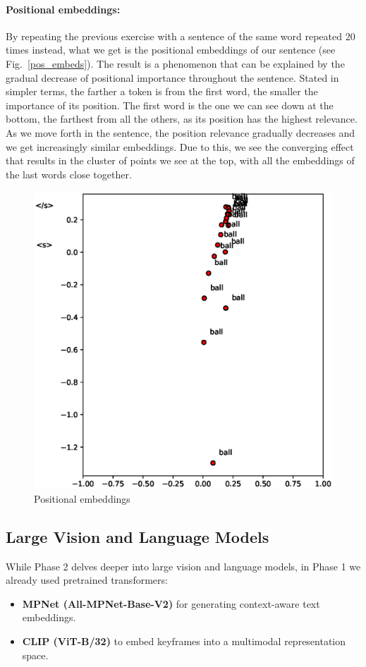 \documentclass[runningheads]{llncs}
\begin{document}
\paragraph{Positional embeddings:}By repeating the previous exercise with a sentence of the same word repeated 20 times instead, what we get is the positional embeddings of our sentence (see Fig.~\ref{pos_embeds}). The result is a phenomenon that can be explained by the gradual decrease of positional importance throughout the sentence. Stated in simpler terms, the farther a token is from the first word, the smaller the importance of its position. The first word is the one we can see down at the bottom, the farthest from all the others, as its position has the highest relevance. As we move forth in the sentence, the position relevance gradually decreases and we get increasingly similar embeddings. Due to this, we see the converging effect that results in the cluster of points we see at the top, with all the embeddings of the last words close together.

\begin{figure}
  \centering
  \includegraphics[width=.5\textwidth, clip=true, trim = 15mm 0mm 0mm 0mm]{../figures/pos_embeds.eps}
  \caption{Positional embeddings}\label{pos_embeds}\label{img:positional_embeddings}
\end{figure}

\subsection{Large Vision and Language Models}
While Phase 2 delves deeper into large vision and language models, in Phase 1 we already used pretrained transformers:

\begin{itemize}
    \item \textbf{MPNet (All-MPNet-Base-V2)} for generating context-aware text embeddings.
    \item \textbf{CLIP (ViT-B/32)} to embed keyframes into a multimodal representation space.
\end{itemize}
\end{document}
